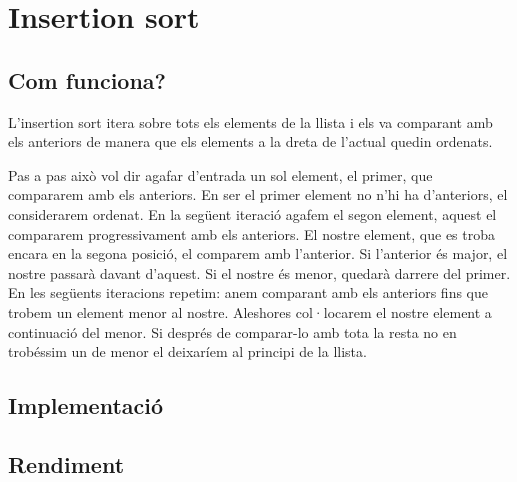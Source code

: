 \chapter{Insertion sort}

\section{Com funciona?}
L'insertion sort itera sobre tots els elements de la llista i els va comparant amb els anteriors de manera que els elements a la dreta de l'actual quedin ordenats.

Pas a pas això vol dir agafar d'entrada un sol element, el primer, que compararem amb els anteriors. En ser el primer element no n'hi ha d'anteriors, el considerarem ordenat.
En la següent iteració agafem el segon element, aquest el compararem progressivament amb els anteriors. El nostre element, que es troba encara en la segona posició, el comparem amb l'anterior. Si l'anterior és major, el nostre passarà davant d'aquest. Si el nostre és menor, quedarà darrere del primer.
En les següents iteracions repetim: anem comparant amb els anteriors fins que trobem un element menor al nostre. Aleshores col·locarem el nostre element a continuació del menor. Si després de comparar-lo amb tota la resta no en trobéssim un de menor el deixaríem al principi de la llista.

\section{Implementació}


\begin{minipage}{\textwidth}
	\section{Rendiment}
	\noindent
	\makebox[\textwidth][c]{
		
	}
	\vspace*{1em}
	\begin{center}
		\resizebox{\textwidth}{!}{}
	\end{center}
\end{minipage}